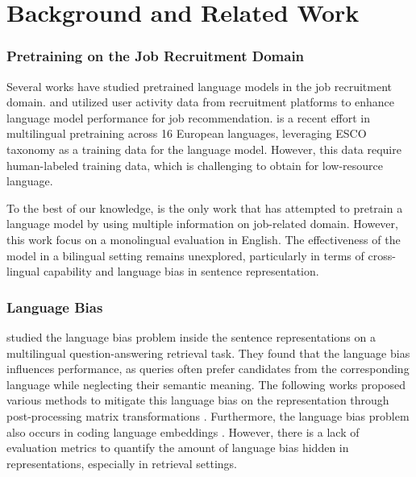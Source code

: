 \section{Background and Related Work}
\subsubsection{Pretraining on the Job Recruitment Domain} Several works have studied pretrained language models in the job recruitment domain. \citeauthor{qin2018enhancing}  and \citeauthor{cao2024tarot}  utilized user activity data from recruitment platforms to enhance language model performance for job recommendation. \citeauthor{zhang-etal-2023-escoxlm}  is a recent effort in multilingual pretraining across 16 European languages, leveraging ESCO taxonomy as a training data for the language model. However, this data require human-labeled training data, which is challenging to obtain for low-resource language. 

To the best of our knowledge, \citeauthor{fang2023recruitpro}  is the only work that has attempted to pretrain a language model by using multiple information on job-related domain. However, this work focus on a monolingual evaluation in English. The effectiveness of the model in a bilingual setting remains unexplored, particularly in terms of cross-lingual capability and language bias in sentence representation. 


\subsubsection{Language Bias} \citeauthor{roy-etal-2020-lareqa}  studied the language bias problem inside the sentence representations on a multilingual question-answering retrieval task. They found that the language bias influences performance, as queries often prefer candidates from the corresponding language while neglecting their semantic meaning. The following works proposed various methods to mitigate this language bias on the representation through post-processing matrix transformations \cite{yang-etal-2021-simple,xie-etal-2022-discovering}. Furthermore, the language bias problem also occurs in coding language embeddings \cite{utpala-etal-2024-language}. However, there is a lack of evaluation metrics to quantify the amount of language bias hidden in representations, especially in retrieval settings.